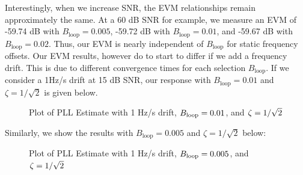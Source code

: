 \documentclass{article}
\begin{document}
Interestingly, when we increase SNR, the EVM relationships remain approximately the same. At a 60 dB SNR for example, we measure an EVM of -59.74 dB with $B_{\text{loop}} = 0.005$, -59.72 dB with $B_{\text{loop}} = 0.01$, and -59.67 dB with $B_{\text{loop}} = 0.02$. Thus, our EVM is nearly independent of $B_{\text{loop}}$ for static frequency offsets. Our EVM results, however do to start to differ if we add a frequency drift. This is due to different convergence times for each selection $B_{\text{loop}}$. If we consider a 1Hz/s drift at 15 dB SNR, our response with $B_{\text{loop}} = 0.01$ and $\zeta = 1/\sqrt{2}$ is given below.

\begin{figure}[H]
	\centerline{}
	\caption{Plot of PLL Estimate with 1 Hz/s drift, $\protect{B_\text{loop}} = 0.01$, and $\protect{\zeta = 1/\sqrt{2}}$}
	\label{fig::convergence_1Hz_drift_Bloop_0p01_damp_sqrt_2}
\end{figure}

\noindent Similarly, we show the results with $B_{\text{loop}} = 0.005$ and $\zeta = 1/\sqrt{2}$ below:

\begin{figure}[H]
	\centerline{}
	\caption{Plot of PLL Estimate with 1 Hz/s drift, $\protect{B_\text{loop}} = 0.005$, and $\protect{\zeta = 1/\sqrt{2}}$}
	\label{fig::convergence_1Hz_drift_Bloop_0p005_damp_sqrt_2}
\end{figure}
\end{document}

